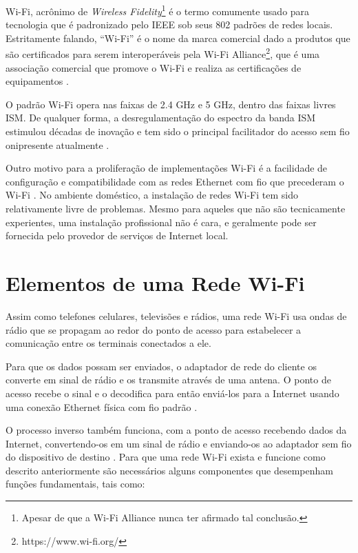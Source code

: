 Wi-Fi, acrônimo de \textit{Wireless Fidelity}\footnote[3]{Apesar de que a Wi-Fi Alliance nunca ter afirmado tal conclusão.} é o termo comumente usado para tecnologia que é padronizado pelo IEEE sob seus 802 padrões de redes locais. Estritamente falando, ``Wi-Fi'' é o nome da marca comercial dado a produtos que são certificados para serem interoperáveis pela Wi-Fi Alliance\footnote[4]{https://www.wi-fi.org/}, que é uma associação comercial que promove o Wi-Fi e realiza as certificações de equipamentos \cite{gorshe2014ieee}.

O padrão Wi-Fi opera nas faixas de 2.4 GHz e 5 GHz, dentro das faixas livres ISM. De qualquer forma, a desregulamentação do espectro da banda ISM estimulou décadas de inovação e tem sido o principal facilitador do acesso sem fio onipresente atualmente \cite{gorshe2014ieee}.

Outro motivo para a proliferação de implementações Wi-Fi é a facilidade de configuração e compatibilidade com as redes Ethernet com fio que precederam o Wi-Fi \cite{gorshe2014ieee}. No ambiente doméstico, a instalação de redes Wi-Fi tem sido relativamente livre de problemas. Mesmo para aqueles que não são tecnicamente experientes, uma instalação profissional não é cara, e geralmente pode ser fornecida pelo provedor de serviços de Internet local.

\section{Elementos de uma Rede Wi-Fi}
\label{elementos-rede-wifi}

Assim como telefones celulares, televisões e rádios, uma rede Wi-Fi usa ondas de rádio que se propagam ao redor do ponto de acesso para estabelecer a comunicação entre os terminais conectados a ele.

Para que os dados possam ser enviados, o adaptador de rede do cliente os converte em sinal de rádio e os transmite através de uma antena. O ponto de acesso recebe o sinal e o decodifica para então enviá-los para a Internet usando uma conexão Ethernet física com fio padrão \cite{brain2001}.

O processo inverso também funciona, com a ponto de acesso recebendo dados da Internet, convertendo-os em um sinal de rádio e enviando-os ao adaptador sem fio do dispositivo de destino \cite{brain2001}.
Para que uma rede Wi-Fi exista e funcione como descrito anteriormente são necessários alguns componentes que desempenham funções fundamentais, tais como:

